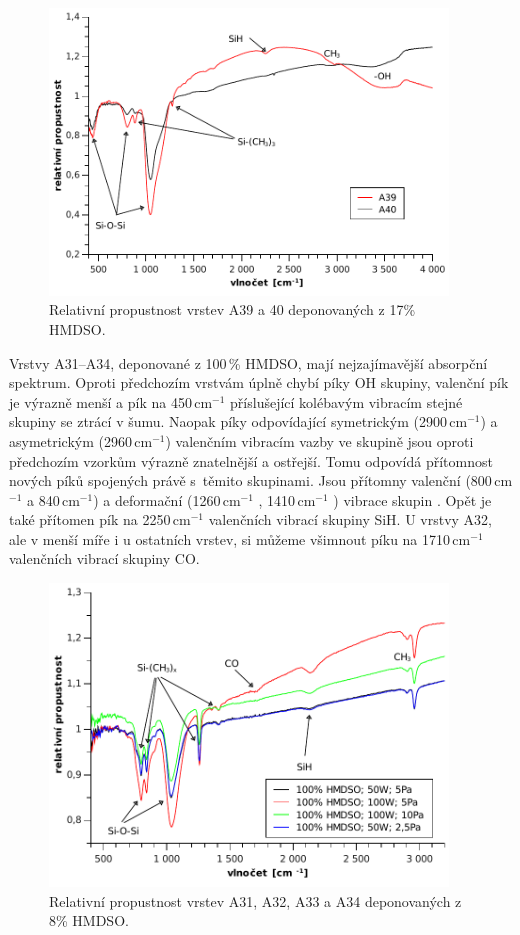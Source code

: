 \documentclass[12pt,oneside,final]{fithesis2}
\begin{document}
\begin{figure}
  \centering
  \includegraphics[width=400px]{img/A39A40ftir.pdf}
  \caption{Relativní propustnost vrstev A39 a 40 deponovaných z 17\% HMDSO.}
  \label{fig:A39A40ftir}
\end{figure}

Vrstvy A31--A34, deponované z 100\,\% HMDSO, mají nejzajímavější absorpční spektrum. Oproti předchozím vrstvám úplně chybí píky OH skupiny, valenční pík  je výrazně menší a pík na 450\,cm$^{-1}$ příslušející kolébavým vibracím stejné skupiny se ztrácí v šumu. Naopak píky odpovídající symetrickým (2900\,cm$^{-1}$) a asymetrickým (2960\,cm$^{-1}$) valenčním vibracím vazby  ve skupině  jsou oproti předchozím vzorkům výrazně znatelnější a ostřejší. Tomu odpovídá přítomnost nových píků spojených právě s~těmito skupinami. Jsou přítomny valenční (800\,cm$^{-1}$ a 840\,cm$^{-1}$) a deformační (1260\,cm$^{-1}$ , 1410\,cm$^{-1}$ ) vibrace skupin . Opět je také přítomen pík na 2250\,cm$^{-1}$ valenčních vibrací skupiny SiH. U vrstvy A32, ale v menší míře i u ostatních vrstev, si můžeme všimnout píku na 1710\,cm$^{-1}$ valenčních vibrací skupiny CO. 

\begin{figure}
  \centering
  \includegraphics[width=400px]{img/A31A34ftir.pdf}
  \caption{Relativní propustnost vrstev A31, A32, A33 a A34 deponovaných z 8\% HMDSO.}
  \label{fig:A31A34ftir}
\end{figure}
\end{document}
